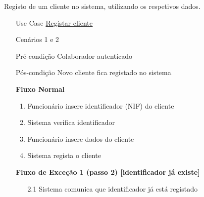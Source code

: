 \documentclass[../relatorio.tex]{subfiles}
\begin{document}
Registo de um cliente no sistema, utilizando os respetivos dados.
\begin{itemize}
    \item[Use Case] {\underline{Registar cliente}}
    \item[Cenários] {1 e 2}
    \item[Pré-condição] {Colaborador autenticado}
    \item[Pós-condição] {Novo cliente fica registado no sistema}
          \begin{flushleft}
              \textbf{Fluxo Normal}
          \end{flushleft}
          \begin{enumerate}
              \item Funcionário insere identificador (NIF) do cliente
              \item Sistema verifica identificador
              \item Funcionário insere dados do cliente
              \item Sistema regista o cliente
          \end{enumerate}
          \begin{flushleft}
              \textbf{Fluxo de Exceção 1 (passo 2) [identificador já existe]}
          \end{flushleft}
          \begin{itemize}
              \item[2.1]{Sistema comunica que identificador já está registado}
          \end{itemize}
\end{itemize}
\end{document}

